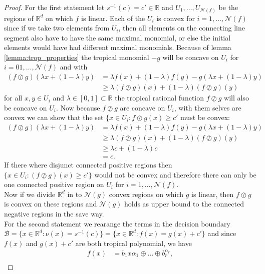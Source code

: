 \documentclass{article}
\theoremstyle{definition}
\begin{document}
\begin{proof}
For the first statement let $s^{-1}(c)=c' \in \mathbb{R}$ and $U_1 , \dots , U_{\mathcal{N}(f)}$ be the regions of $\mathbb{R}^{d}$ on which $f$ is linear. Each of the $U_i$ is convex for $i=1 , \dots , \mathcal{N}(f)$ since if we take two elements from $U_i$, then all elements on the connecting line segment also have to have the same maximal monomial, or else the initial elements would have had different maximal monomials. Because of lemma \ref{lemma:trop_properties} the tropical monomial $-g$ will be concave on $U_i$ for $i = 0 1, \dots , \mathcal{N}(f)$ and with
\begin{align*}
(f \oslash g) (\lambda x + (1-\lambda)y)
&= \lambda f(x) + (1-\lambda) f(y) - g(\lambda x + (1-\lambda)y) \\
&\geq \lambda (f \oslash g)(x) + (1-\lambda) (f \oslash g) (y)
\end{align*}
for all $x, y \in U_i$ and $\lambda \in [0,1] \subset \mathbb{R}$ the tropical rational function $f \oslash g$ will also be concave on $U_i$. Now because $f \oslash g$ are concave on $U_i$, with them selves are convex we can show that the set $\{x \in U_i : f \oslash g(x) \geq c'$ must be convex:
\begin{align*}
(f \oslash g) (\lambda x + (1-\lambda)y)
&= \lambda f(x) + (1-\lambda) f(y) - g(\lambda x + (1-\lambda)y) \\
&\geq \lambda (f \oslash g)(x) + (1-\lambda) (f \oslash g) (y) \\
&\geq \lambda c + (1-\lambda)c \\
&= c.
\end{align*}
If there where disjunct connected positive regions then $\{ x \in U_i : (f \oslash g)(x) \geq c' \}$ would not be convex and therefore there can only be one connected positive region on $U_i$ for $i = 1, \dots , \mathcal{N}(f)$. \\
Now if we divide $\mathbb{R}^{d}$ in to $\mathcal{N}(g)$ convex regions on which $g$ is linear, then $f \oslash g$ is convex on these regions and $\mathcal{N}(g)$ holds as upper bound to the connected negative regions in the save way. \\
For the second statement we rearange the terms in the decision boundary $\mathcal{B} = \{ x \in \mathbb{R}^{d} : \nu(x) = s^{-1}(c) \} = \{ x \in \mathbb{R}^{d} : f(x) = g(x) + c' \}$ and since $f(x)$ and $g(x) + c'$ are both tropical polynomial, we have
\begin{align*}
f(x) &= b_1 x{\alpha_1} \oplus \dots \oplus b_r^{\alpha_r}, \\

\end{align*}
\end{proof}
\end{document}
